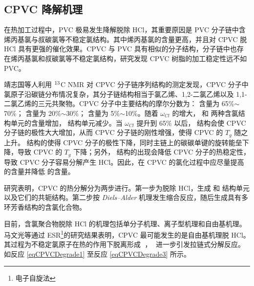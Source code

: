 \subsection{CPVC 降解机理}
在热加工过程中，PVC 极易发生降解脱除 HCl，其重要原因是 PVC 分子链中含烯丙基氯与叔碳氯等不稳定氯结构\cite{15}。其中烯丙基氯的含量更高，并且对 CPVC 脱 HCl 具有更强的催化效果。CPVC 与 PVC 具有相似的分子结构，分子链中也存在烯丙基氯和叔碳氯等不稳定氯结构，研究发现 CPVC 树脂的加工稳定性远不如 PVC\cite{6}。\par
\setatomsep{1.5em}
靖志国等人利用 $\rm{^{13}}$C NMR 对 CPVC 分子链序列结构的测定发现，CPVC 分子中氯原子沿碳链分布情况复杂，其分子链结构相当于氯乙烯、1,2-二氯乙烯以及 1,1-二氯乙烯的三元共聚物。CPVC 分子中主要结构的摩尔分数为： 含量为 65\%$\sim$70\%； 含量为 20\%$\sim$30\%； 含量为 5\%$\sim$10\%。随着 $\omega_{Cl}$ 的增大， 和  两种含氯结构单元的含量增加， 结构单元减少。当 $\omega_{Cl}$ 提升到 65\% 以后，  结构会使 CPVC 分子链的极性大大增加，从而 CPVC 分子链的刚性增强，使得 CPVC 的 $T_g$ 随之上升。 结构的使得 CPVC 分子的极性下降，同时主链上的碳碳单键的旋转能垒下降，导致 CPVC 的 $T_g$ 下降；另外， 结构的出现会降低 CPVC 分子的热稳定性，导致 CPVC 分子容易分解产生 HCl。因此，在 CPVC 的氯化过程中应尽量提高   的含量并降低   的含量\cite{4}。\par

研究表明，CPVC 的热分解分为两步进行\cite{12, 13}。第一步为脱除 HCl，生成  和  结构单元以及它们的共轭结构。第二步按 \textit{Diels–Alder} 机理发生缩合反应，随后生成具有多环芳香结构的含氯化合物。\par
目前，含氯聚合物脱除 HCl 的机理包括单分子机理、离子型机理和自由基机理。马文光等\cite{22}通过 ESR\footnote{电子自旋法}的研究结果表明，CPVC 最可能发生的是自由基机理脱 HCl。其过程为不稳定氯原子在热的作用下脱离形成 $\;$，$\;$ 进一步引发拉链式分解反应。如反应 \eqref{eqCPVCDegrade1} 至反应 \eqref{eqCPVCDegrade3} 所示。

\setpolymerdelim[]
\setatomsep{2em}

